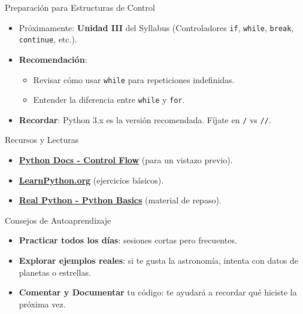 \documentclass[10pt]{beamer}
\begin{document}
\begin{frame}{Preparación para Estructuras de Control}
  \begin{itemize}
    \item Próximamente: \textbf{Unidad III} del Syllabus (Controladores \texttt{if}, \texttt{while}, \texttt{break}, \texttt{continue}, etc.).
    \item \textbf{Recomendación}:
      \begin{itemize}
        \item Revisar cómo usar \texttt{while} para repeticiones indefinidas.
        \item Entender la diferencia entre \texttt{while} y \texttt{for}.
      \end{itemize}
    \item \textbf{Recordar}: Python 3.x es la versión recomendada. Fíjate en \texttt{/} vs \texttt{//}.
  \end{itemize}
\end{frame}

\begin{frame}{Recursos y Lecturas}
  \begin{itemize}
    \item \href{https://docs.python.org/3/tutorial/controlflow.html}{\textbf{Python Docs - Control Flow}} (para un vistazo previo).
    \item \href{https://www.learnpython.org/}{\textbf{LearnPython.org}} (ejercicios básicos).
    \item \href{https://realpython.com/python-basics/}{\textbf{Real Python - Python Basics}} (material de repaso).
  \end{itemize}
\end{frame}

\begin{frame}{Consejos de Autoaprendizaje}
  \begin{itemize}
    \item \textbf{Practicar todos los días}: sesiones cortas pero frecuentes.
    \item \textbf{Explorar ejemplos reales}: si te gusta la astronomía, intenta con datos de planetas o estrellas.
    \item \textbf{Comentar y Documentar} tu código: te ayudará a recordar qué hiciste la próxima vez.
  \end{itemize}
\end{frame}
\end{document}
